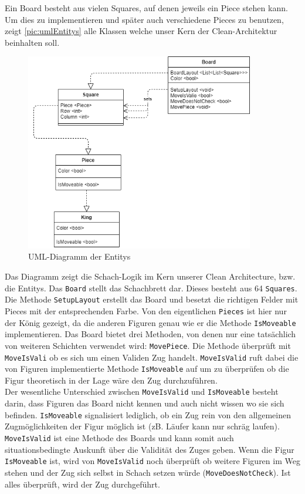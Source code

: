 \documentclass[
10pt, %
a4paper, %
oneside, %
headinclude,footinclude, %
BCOR5mm, %
]{scrartcl}
\begin{document}
Ein Board besteht aus vielen Squares, auf denen jeweils ein Piece stehen kann. Um dies zu implementieren und später auch verschiedene Pieces zu benutzen, zeigt \autoref{pic:umlEntitys} alle Klassen welche unser Kern der Clean-Architektur beinhalten soll. 
\begin{figure}[h]
	\begin{center}
		\includegraphics[width=10cm]{entitys.png}
		\caption{\label{pic:umlEntitys} UML-Diagramm der Entitys}
	\end{center}
\end{figure}
Das Diagramm zeigt die Schach-Logik im Kern unserer Clean Architecture, bzw. die Entitys. Das \texttt{Board} stellt das Schachbrett dar. Dieses besteht aus 64 \texttt{Squares}. Die Methode \texttt{SetupLayout} erstellt das Board und besetzt die richtigen Felder mit Pieces mit der entsprechenden Farbe.
Von den eigentlichen \texttt{Pieces} ist hier nur der König gezeigt, da die anderen Figuren genau wie er die Methode \texttt{IsMoveable} implementieren. 
Das Board bietet drei Methoden, von denen nur eine tatsächlich von weiteren Schichten verwendet wird: \texttt{MovePiece}. Die Methode überprüft mit \texttt{MoveIsVali} ob es sich um einen Validen Zug handelt. \texttt{MoveIsValid} ruft dabei die von Figuren implementierte Methode \texttt{IsMoveable} auf um zu überprüfen ob die Figur theoretisch in der Lage wäre den Zug durchzuführen.\\ Der wesentliche Unterschied zwischen \texttt{MoveIsValid} und \texttt{IsMoveable} besteht darin, dass Figuren das Board nicht kennen und auch nicht wissen wo sie sich befinden. \texttt{IsMoveable} signalisiert lediglich, ob ein Zug rein von den allgemeinen Zugmöglichkeiten der Figur möglich ist (zB. Läufer kann nur schräg laufen). \texttt{MoveIsValid} ist eine Methode des Boards und kann somit auch situationsbedingte Auskunft über die Validität des Zuges geben. Wenn die Figur \texttt{IsMoveable} ist, wird von \texttt{MoveIsValid} noch überprüft ob weitere Figuren im Weg stehen und der Zug sich selbst in Schach setzen würde (\texttt{MoveDoesNotCheck}). Ist alles überprüft, wird der Zug durchgeführt.
\end{document}
